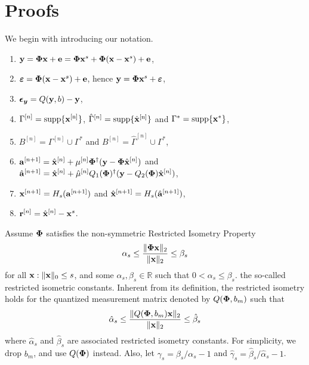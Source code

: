 \documentclass{article}
\begin{document}
\section{Proofs}
We begin with introducing our notation.
\begin{enumerate}
    \item ${\bf y} = {\bf \Phi} {\bf x} + {\bf e} = {\bf \Phi} {\bf x}^s + {\bf \Phi}({\bf x}-{\bf x}^s) + {\bf e}$,
    \item $\boldsymbol{\varepsilon} = {\bf \Phi}({\bf x}-{\bf x}^s) + {\bf e}$, hence ${\bf y} = {\bf \Phi} {\bf x}^s + \boldsymbol{\varepsilon}$,
    \item $\boldsymbol{\epsilon_y} = Q({\bf y},b) - {\bf y}$,
    \item $\Gamma^{[n]} = \rm{supp}\{{\bf x}^{[n]} \}$, $\hat{\Gamma}^{[n]} = \rm{supp}\{\hat{{\bf x}}^{[n]} \}$ and $\Gamma^{*} = \rm{supp}\{{\bf x}^{*} \}$,
    \item $B^{[n]} = \Gamma^{[n]} \cup \Gamma^{*}$ and $B^{[n]} = \hat{\Gamma}^{[n]} \cup \Gamma^{*}$,
    \item ${\bf a}^{[n+1]} = \hat{{\bf x}}^{[n]} + \mu^{[n]}{\bf \Phi}^{\dag}({\bf y} - {\bf \Phi}\hat{{\bf x}}^{[n]})$ and $\hat{{\bf a}}^{[n+1]} = \hat{{\bf x}}^{[n]} + \hat{\mu}^{[n]}Q_{1}({\bf \Phi})^{\dag}({\bf y} - Q_2({\bf \Phi})\hat{{\bf x}}^{[n]})$,
    \item ${\bf x}^{[n+1]} = H_s({\bf a}^{[n+1]})$ and $\hat{{\bf x}}^{[n+1]} = H_s(\hat{{\bf a}}^{[n+1]})$,
    \item ${\bf r}^{[n]} = \hat{{\bf x}}^{[n]}-{\bf x}^s$.
\end{enumerate}
Assume $\mathbf{\bf \Phi}$ satisfies the non-symmetric Restricted Isometry Property 
\begin{equation}\label{rip}
\alpha_{s} \leq \frac{\|{\bf {\bf \Phi}} {\bf x}\|_2}{\|{\bf x}\|_2} \leq \beta_{s}
\end{equation}
for all ${\bf x}: \|{\bf x}\|_0 \leq s$, and some $\alpha_s, \beta_s \in \mathbb{R}$ such that $0<\alpha_s\leq \beta_s$. the so-called restricted isometric constants. Inherent from its definition, the restricted isometry holds for the quantized measurement matrix denoted by $Q({\bf {\bf \Phi}}, b_m)$ such that
\begin{equation}\label{rip_lowprecision}
\hat{\alpha}_{s} \leq \frac{\|Q({\bf {\bf \Phi}}, b_m) {\bf x}\|_2}{\|{\bf x}\|_2} \leq \hat{\beta}_{s}
\end{equation}
where $\hat{\alpha}_{s}$ and $\hat{\beta}_{s}$ are associated restricted isometry constants. For simplicity, we drop $b_m$, and use $Q({\bf {\bf \Phi}})$ instead. Also, let $\gamma_s=\beta_s/\alpha_s-1$ and $\hat{\gamma}_s=\hat{\beta}_s/\hat{\alpha}_s-1$.
\end{document}
